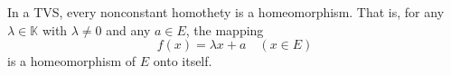 In a TVS, every nonconstant homothety is a homeomorphism. That is, for any $\lambda \in \mathbb{K}$ with $\lambda \neq 0$ and any $a \in E$, the mapping
$$f(x) = \lambda x + a \quad (x \in E)$$
is a homeomorphism of $E$ onto itself.
